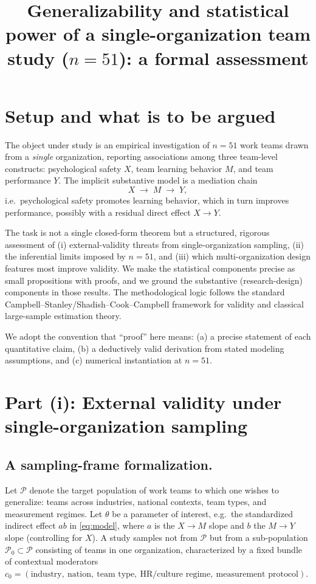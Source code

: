 \documentclass{amsart}
\theoremstyle{definition}
\begin{document}
\title{Generalizability and statistical power of a single-organization
team study ($n=51$): a formal assessment}
\maketitle

\section*{Setup and what is to be argued}

The object under study is an empirical investigation of $n=51$ work teams
drawn from a \emph{single} organization, reporting associations among three
team-level constructs: psychological safety $X$, team learning behavior $M$,
and team performance $Y$. The implicit substantive model is a mediation
chain
\begin{equation}\label{eq:model}
  X \;\longrightarrow\; M \;\longrightarrow\; Y,
\end{equation}
i.e.\ psychological safety promotes learning behavior, which in turn
improves performance, possibly with a residual direct effect $X\to Y$.

The task is not a single closed-form theorem but a structured, rigorous
assessment of (i) external-validity threats from single-organization
sampling, (ii) the inferential limits imposed by $n=51$, and (iii) which
multi-organization design features most improve validity. We make the
statistical components precise as small propositions with proofs, and we
ground the substantive (research-design) components in those results. The
methodological logic follows the standard Campbell--Stanley/Shadish--Cook--Campbell
framework for validity and classical large-sample estimation theory.

We adopt the convention that ``proof'' here means: (a) a precise statement of
each quantitative claim, (b) a deductively valid derivation from stated
modeling assumptions, and (c) numerical instantiation at $n=51$.

\section*{Part (i): External validity under single-organization sampling}

\subsection*{A sampling-frame formalization.}
Let $\mathcal{P}$ denote the target population of work teams to which one
wishes to generalize: teams across industries, national contexts, team
types, and measurement regimes. Let $\theta$ be a parameter of interest,
e.g.\ the standardized indirect effect $a b$ in \eqref{eq:model}, where $a$
is the $X\to M$ slope and $b$ the $M\to Y$ slope (controlling for $X$).
A study samples not from $\mathcal{P}$ but from a sub-population
$\mathcal{P}_0\subset\mathcal{P}$ consisting of teams in one organization,
characterized by a fixed bundle of contextual moderators
$c_0=(\text{industry},\ \text{nation},\ \text{team type},\ \text{HR/culture
regime},\ \text{measurement protocol})$.
\end{document}
